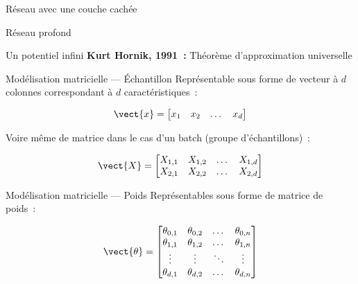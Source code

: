 \begin{frame}{Réseau avec une couche cachée}
  \centering
\end{frame}

\begin{frame}{Réseau profond}
  \centering
\end{frame}

\begin{frame}{Un potentiel infini}
  \textbf{Kurt Hornik, 1991~:} Théorème d'approximation universelle

\end{frame}

\begin{frame}{Modélisation matricielle --- Échantillon}
  Représentable sous forme de vecteur à $d$ colonnes correspondant à $d$ caractéristiques~:

  \[
    \vect{x} = \begin{bmatrix}
      x_1 & x_2 & \dots & x_d
    \end{bmatrix}
  \]

  Voire même de matrice dans le cas d'un batch (groupe d'échantillons)~:

  \[
    \vect{X} = \begin{bmatrix}
      X_{1,1} & X_{1,2} & \dots & X_{1,d} \\
      X_{2,1} & X_{2,2} & \dots & X_{2,d}
    \end{bmatrix}
  \]
\end{frame}

\begin{frame}{Modélisation matricielle --- Poids}
  Représentables sous forme de matrice de poids~:

  \[
    \vect{\theta} = \begin{bmatrix}
      \theta_{0,1} & \theta_{0,2} & \dots  & \theta_{0,n} \\
      \theta_{1,1} & \theta_{1,2} & \dots  & \theta_{1,n} \\
      \vdots & \vdots & \ddots & \vdots \\
      \theta_{d,1} & \theta_{d,2} & \dots  & \theta_{d,n}
    \end{bmatrix}
  \]
\end{frame}


